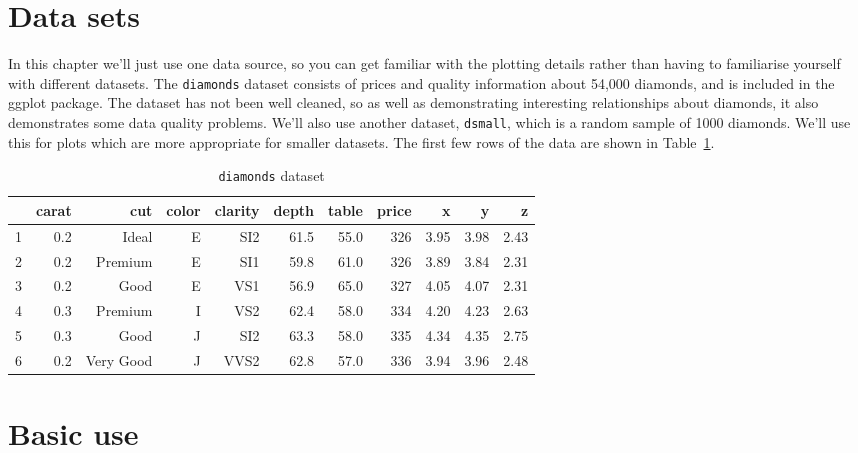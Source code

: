 \section{Data sets}\label{sec:data_sets}

In this chapter we'll just use one data source, so you can get familiar with the plotting details rather than having to familiarise yourself with different datasets.  The {\tt diamonds} dataset consists of prices and quality information about 54,000 diamonds, and is included in the ggplot package.  The dataset has not been well cleaned, so as well as demonstrating interesting relationships about diamonds, it also demonstrates some data quality problems.  We'll also use another dataset, {\tt dsmall}, which is a random sample of 1000 diamonds.  We'll use this for plots which are more appropriate for smaller datasets.  The first few rows of the data are shown in Table~\ref{tab:diamonds}.

\begin{table}[ht]
\begin{center}
\begin{tabular}{l|rrrrrrrrrr}
  \hline
 & carat & cut & color & clarity & depth & table & price & x & y & z \\
  \hline
1 & 0.2 & Ideal & E & SI2 & 61.5 & 55.0 & 326 & 3.95 & 3.98 & 2.43 \\
  2 & 0.2 & Premium & E & SI1 & 59.8 & 61.0 & 326 & 3.89 & 3.84 & 2.31 \\
  3 & 0.2 & Good & E & VS1 & 56.9 & 65.0 & 327 & 4.05 & 4.07 & 2.31 \\
  4 & 0.3 & Premium & I & VS2 & 62.4 & 58.0 & 334 & 4.20 & 4.23 & 2.63 \\
  5 & 0.3 & Good & J & SI2 & 63.3 & 58.0 & 335 & 4.34 & 4.35 & 2.75 \\
  6 & 0.2 & Very Good & J & VVS2 & 62.8 & 57.0 & 336 & 3.94 & 3.96 & 2.48 \\
   \hline
\end{tabular}
\caption{{\tt diamonds} dataset}
\label{tab:diamonds}
\end{center}
\end{table}

\section{Basic use}\label{sec:basic_use}

